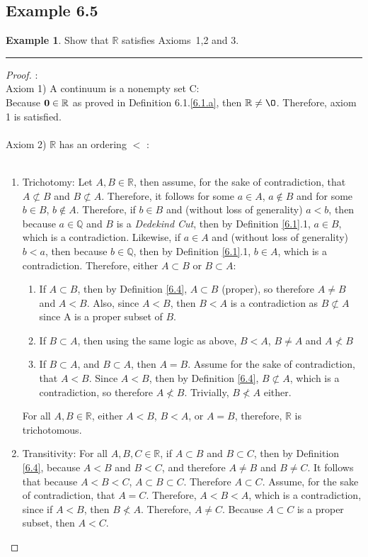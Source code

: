 \documentclass[openany, amssymb, psamsfonts]{amsart}
\newcommand{\bbQ}{\mathbb{Q}}
\newcommand{\bbR}{\mathbb{R}}
\renewcommand{\emptyset}{\O}
\theoremstyle{definition}
\newtheorem{exmp}{Example}[section]
\numberwithin{equation}{section}
\begin{document}
\subsection*{Example 6.5}
\begin{exmp}
\label{6.5}
Show that $\bbR$ satisfies Axioms~1,2 and 3.
\end{exmp}
\vspace{4pt}     \hrule   \vspace{4pt} \begin{proof} :\\
Axiom 1) A continuum is a nonempty set C:\\
Because $\bold{0}\in \bbR$ as proved in Definition 6.1.\ref{6.1.a}, then $\bbR \neq \emptyset$. Therefore, axiom 1 is satisfied.\\\\
Axiom 2) $\bbR$ has an ordering $<$ :\\\\
\begin{enumerate}
\item Trichotomy: Let $A,B \in \bbR$, then assume, for the sake of contradiction, that $A\not\subset B$ and $B\not\subset A$. Therefore, it follows for some $a\in A$, $a\notin B$ and for some $b\in B$, $b\notin A$. Therefore, if $b\in B$ and (without loss of generality) $a<b$, then because $a\in \bbQ$ and $B$ is a \textit{Dedekind Cut}, then by Definition \ref{6.1}.1, $a\in B$, which is a contradiction. Likewise, if $a\in A$ and (without loss of generality) $b<a$, then because $b\in \bbQ$, then by Definition \ref{6.1}.1, $b\in A$, which is a contradiction. Therefore, either $A\subset B$ or $B\subset A$:
\begin{enumerate}
\item If $A\subset B$, then by Definition \ref{6.4}, $A\subset B$ (proper), so therefore $A\neq B$ and $A<B$. Also, since $A<B$, then $B<A$ is a contradiction as $B\not\subset A$ since A is a proper subset of $B$. 
\item If $B\subset A$, then using the same logic as above, $B<A$, $B\neq A$ and $A\not< B$
\item If $B\subset A$, and $B\subset A$, then $A=B$. Assume for the sake of contradiction, that $A<B$. Since $A<B$, then by Definition \ref{6.4}, $B\not\subset A$, which is a contradiction, so therefore $A\not<B$. Trivially, $B\not< A$ either. 
\end{enumerate}
For all $A,B \in \bbR$, either $A<B$, $B<A$, or $A=B$, therefore, $\bbR$ is trichotomous.
\item Transitivity: For all $A,B,C\in \bbR$, if $A\subset B$ and $B\subset C$, then by Definition \ref{6.4}, because $A < B$ and $B < C$, and therefore $A\neq B$ and $B\neq C$. It follows that because $A<B<C$, $A\subset B \subset C$. Therefore $A\subset C$. Assume, for the sake of contradiction, that $A = C$. Therefore, $A<B<A$, which is a contradiction, since if $A<B$, then $B\not< A$. Therefore, $A\neq C$. Because $A\subset C$ is a proper subset, then $A<C$.

\end{enumerate}
\end{proof}
\end{document}
